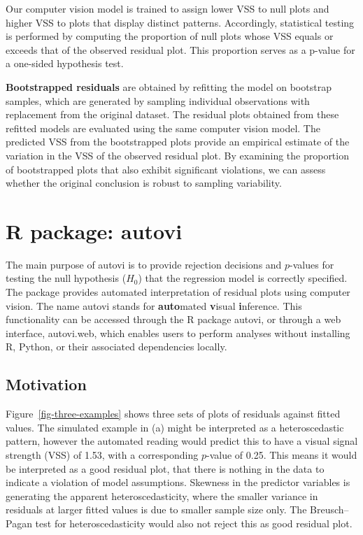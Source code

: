 \documentclass[
doublespace,
  times]{anzsauth}
\begin{document}
Our computer vision model is trained to assign lower VSS to null plots
and higher VSS to plots that display distinct patterns. Accordingly,
statistical testing is performed by computing the proportion of null
plots whose VSS equals or exceeds that of the observed residual plot.
This proportion serves as a p-value for a one-sided hypothesis test.

\textbf{Bootstrapped residuals} are obtained by refitting the model on
bootstrap samples, which are generated by sampling individual
observations with replacement from the original dataset. The residual
plots obtained from these refitted models are evaluated using the same
computer vision model. The predicted VSS from the bootstrapped plots
provide an empirical estimate of the variation in the VSS of the
observed residual plot. By examining the proportion of bootstrapped
plots that also exhibit significant violations, we can assess whether
the original conclusion is robust to sampling variability.

\section{\texorpdfstring{\textsf{R} package:
\textsf{autovi}}{ package: }}\label{sec-autovi}

The main purpose of \textsf{autovi} is to provide rejection decisions
and \(p\)-values for testing the null hypothesis (\(H_0\)) that the
regression model is correctly specified. The package provides automated
interpretation of residual plots using computer vision. The name
\textsf{autovi} stands for \textbf{auto}mated \textbf{v}isual
\textbf{i}nference. This functionality can be accessed through the
\textsf{R} package \textsf{autovi}, or through a web interface,
\textsf{autovi.web}, which enables users to perform analyses without
installing \textsf{R}, \textsf{Python}, or their associated dependencies
locally.

\subsection{Motivation}\label{sec-why}

Figure~\ref{fig-three-examples} shows three sets of plots of residuals
against fitted values. The simulated example in (a) might be interpreted
as a heteroscedastic pattern, however the automated reading would
predict this to have a visual signal strength (VSS) of 1.53, with a
corresponding \(p\)-value of 0.25. This means it would be interpreted as
a good residual plot, that there is nothing in the data to indicate a
violation of model assumptions. Skewness in the predictor variables is
generating the apparent heteroscedasticity, where the smaller variance
in residuals at larger fitted values is due to smaller sample size only.
The Breusch--Pagan test \citep{breusch1979simple} for heteroscedasticity
would also not reject this as good residual plot.
\end{document}
